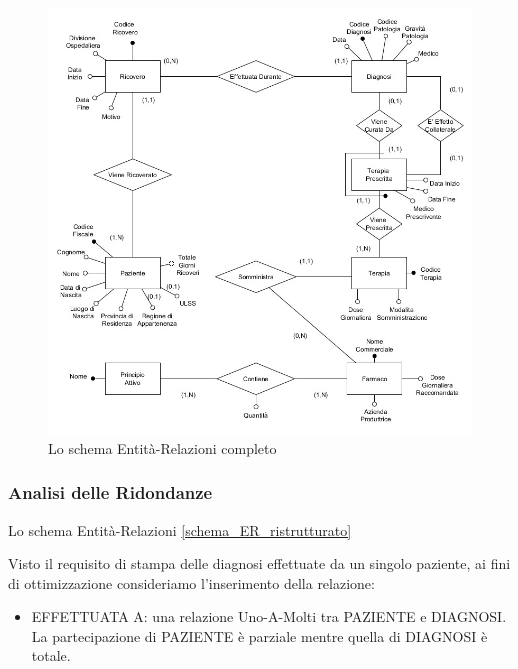 \documentclass{article}
\begin{document}
\begin{figure}[H] %
  \centering
  \includegraphics[width=\linewidth]{schema2}
  \caption{Lo schema Entità-Relazioni completo}
  \label{schema_ER_ristrutturato}
\end{figure}



\clearpage
\subsubsection{Analisi delle Ridondanze}

Lo schema Entità-Relazioni  \autoref{schema_ER_ristrutturato} %


Visto il requisito di stampa delle diagnosi effettuate da un singolo paziente, ai fini di ottimizzazione consideriamo l'inserimento della relazione:
\begin{itemize}
\item EFFETTUATA A: una relazione Uno-A-Molti tra PAZIENTE 
          e DIAGNOSI. La partecipazione di PAZIENTE è parziale mentre quella
          di DIAGNOSI è totale. 
\end{itemize}
\end{document}
